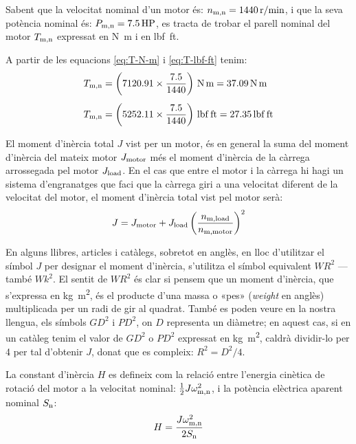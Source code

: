 	
\begin{exemple}[\MotorParellNom{}]
	\addcontentsxms{\MotorParellNom}
    Sabent que la velocitat nominal d'un motor és: $n_\mathrm{m,n} = \qty{1440}{r/min}$, i que la seva potència nominal és: $P_\mathrm{m,n} = \qty{7,5}{HP}$,   es tracta de trobar el parell nominal del motor $T_\mathrm{m,n}$ expressat en \unit{N.m} i en \unit{lbf.ft}.

    A partir de les equacions  \eqref{eq:T-N-m} i \eqref{eq:T-lbf-ft} tenim:
    \begin{align*}
      T\ped{m,n} &= \left(\num{7120,91} \times \frac{\num{7,5}}{1440}\right)
      \,\unit{N.m} = \qty{37,09}{N.m} \\[1ex]
      T\ped{m,n} &= \left(\num{5252,11} \times \frac{\num{7,5}}{1440}\right)
      \,\unit{lbf.ft} = \qty{27,35}{lbf.ft}
    \end{align*}
\end{exemple}


El moment d'inèrcia total $J$ vist per un motor, és en general la suma del moment d'inèrcia del mateix motor  $J_\mathrm{motor}$ més el moment d'inèrcia de la càrrega arrossegada pel motor $J_\mathrm{load}$. En el cas que entre el motor i la càrrega hi hagi un sistema d'engranatges que faci que la càrrega giri a una velocitat diferent de la velocitat del motor, el  moment d'inèrcia total vist pel motor serà:
\begin{equation}\index{moment!d'inèrcia}\index{J@$J$}
    J = J\ped{motor} +  J\ped{load}
    \left(\frac{n\ped{m,load}}{n\ped{m,motor}}\right)^2
\end{equation}

En alguns llibres, articles i catàlegs, sobretot en anglès, en lloc d'utilitzar el símbol $J$ per designar el moment d'inèrcia, s'utilitza el símbol equivalent $WR^2$ ---també $Wk^2$. El sentit de $WR^2$ és clar si pensem que un moment d'inèrcia, que s'expressa en \unit{kg.m^2},  és el producte d'una massa o «pes» (\textit{weight} en anglès) multiplicada per un radi de gir al quadrat. També es poden veure en la nostra llengua, els símbols $GD^2$ i $PD^2$, on $D$ representa un diàmetre; en aquest cas, si en un catàleg tenim el valor de $GD^2$ o $PD^2$ expressat en \unit{kg.m^2}, caldrà dividir-lo per 4 per tal d'obtenir $J$, donat que es compleix: $R^2 = D^2/4$.

La constant d'inèrcia $H$ es defineix com la relació entre l'energia cinètica de rotació del motor  a la velocitat nominal: $\frac{1}{2} J \omega_\mathrm{m,n}^2$, i la  potència elèctrica aparent nominal $S_\mathrm{n}$:
\begin{equation}\index{constants!d'inèrcia}\index{H@$H$}
    H = \frac{J \omega\ped{m,n}^2}{2 S\ped{n}}
\end{equation}

